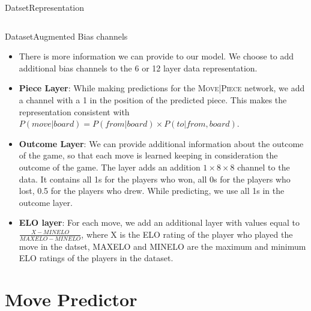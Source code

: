 \documentclass[9pt, unknownkeysallowed]{beamer}
\begin{document}
\begin{frame}{Datset}{Representation}
\begin{columns}
 \end{columns}

\centering

\end{frame}

\begin{frame}{Dataset}{Augmented Bias channels}
\begin{itemize}
 \item There is more information we can provide to our model. We choose to add 
additional bias channels to the 6 or 12 layer data representation.
  \item \textbf{Piece Layer}: While making predictions for the 
\textsc{Move|Piece} network, we add a channel with a 1 in the position of the 
predicted piece. This makes the representation consistent with $P(move | board) 
= P(from|board)\times P(to|from, board)$.
  \item \textbf{Outcome Layer}: We can provide additional information about the 
outcome of the game, so that each move is learned keeping in consideration the 
outcome of the game. The layer adds an addition $1\times 8 \times 8$ channel to 
the data. It contains all 1s for the players who won, all 0s for the players 
who lost, 0.5 for the players who drew. While predicting, we use all 1s in the 
outcome layer.
  \item \textbf{ELO layer}: For each move, we add an additional layer with 
values equal to $\frac{X-MINELO}{MAXELO-MINELO}$, where X is the ELO rating of 
the player who played the move in the datset, MAXELO and MINELO are the 
maximum and minimum ELO ratings of the players in the dataset.
\end{itemize}
 
\end{frame}


\section{Move Predictor}
\end{document}
